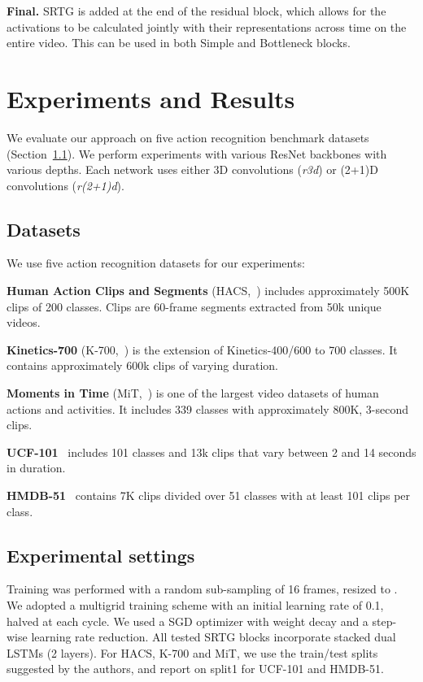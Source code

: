 \documentclass[final,5p,times,twocolumn]{elsarticle}
\begin{document}
\textbf{Final.} SRTG is added at the end of the residual block, which allows for the activations to be calculated jointly with their representations across time on the entire video. This can be used in both Simple and Bottleneck blocks.



\section{Experiments and Results}
\label{sec:results}
We evaluate our approach on five action recognition benchmark datasets (Section~\ref{subsec:datasets}). We perform experiments with various ResNet backbones with various depths. Each network uses either 3D convolutions (\textit{r3d}) or (2+1)D convolutions (\textit{r(2+1)d}).

\subsection{Datasets} \label{subsec:datasets}
We use five action recognition datasets for our experiments:

\textbf{Human Action Clips and Segments} (HACS,~\cite{zhao2019hacs}) includes approximately 500K clips of 200 classes. Clips are 60-frame segments extracted from 50k unique videos.

\textbf{Kinetics-700} (K-700,~\cite{carreira2019short}) is the extension of Kinetics-400/600 to 700 classes. It contains approximately 600k clips of varying duration. 

\textbf{Moments in Time} (MiT,~\cite{monfort2018moments}) is one of the largest video datasets of human actions and activities. It includes 339 classes with approximately 800K, 3-second clips.

\textbf{UCF-101}~\citep{soomro2012ucf101} includes 101 classes and 13k clips that vary between 2 and 14 seconds in duration.

\textbf{HMDB-51}~\citep{kuehne2011hmdb} contains 7K clips divided over 51 classes with at least 101 clips per class.


\subsection{Experimental settings}

Training was performed with a random sub-sampling of 16 frames, resized to . We adopted a multigrid training scheme \citep{wu2019multigrid} with an initial learning rate of 0.1, halved at each cycle. We used a SGD optimizer with  weight decay and a step-wise learning rate reduction. All tested SRTG blocks incorporate stacked dual LSTMs (2 layers). For HACS, K-700 and MiT, we use the train/test splits suggested by the authors, and report on split1 for UCF-101 and HMDB-51.
\end{document}
